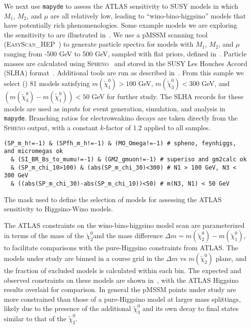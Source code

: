 \documentclass{article}
\newcommand{\chioz}{\ensuremath{\widetilde{\chi}_{1}^{0}}}
\newcommand{\chitz}{\ensuremath{\widetilde{\chi}_{2}^{0}}}
\newcommand{\chithz}{\ensuremath{\widetilde{\chi}_{3}^{0}}}
\newcommand{\mapyde}{\texttt{mapyde}}
\newcommand{\easyscanhep}{\textsc{EasyScan\_HEP}}
\newcommand{\spheno}{\textsc{Spheno}}
\begin{document}
We next use \mapyde{} to assess the ATLAS sensitivity to SUSY models in which $M_1$, $M_2$, and $\mu$ are all relatively low, leading to \enquote{wino-bino-higgsino} models that have potentially rich phenomenologies. Some example models we are exploring the sensitivity to are illustrated in~. We use a pMSSM scanning tool (\easyscanhep~\cite{easyscanhep,Han:2016gvr}) to generate particle spectra for models with $M_1$, $M_2$, and $\mu$ ranging from -500 GeV to 500 GeV, sampled with flat priors, defined in~.  Particle masses are calculated using \spheno~\cite{Porod:2003um,Porod:2011nf} and stored in the SUSY Les Houches Accord (SLHA) format~\cite{Allanach:2008qq}.  Additional tools are run as described in~.  From this sample we select () 81 models satisfying $m(\chioz) > 100$ GeV, $m(\chithz)<300$ GeV, and $(m(\chithz)-m(\chioz))<50$ GeV for further study.  The SLHA records for these models are used as inputs for event generation, simulation, and analysis in \mapyde.  Branching ratios for electroweakino decays are taken directly from the \spheno{} output, with a constant $k$-factor of 1.2 applied to all samples.

\begin{listing}[H]
	\begin{verbatim}
(SP_m_h!=-1) & (SPfh_m_h!=-1) & (MO_Omega!=-1) # spheno, feynhiggs, and micromegas ok
  & (SI_BR_Bs_to_mumu!=-1) & (GM2_gmuon!=-1) # superiso and gm2calc ok
  & (SP_m_chi_10>100) & (abs(SP_m_chi_30)<300) # N1 > 100 GeV, N3 < 300 GeV
  & ((abs(SP_m_chi_30)-abs(SP_m_chi_10))<50) # m(N3, N1) < 50 GeV
  \end{verbatim}
	\caption{The mask used to define the selection of models for assessing the ATLAS sensitivity to Higgsino-Wino models.}
	\label{lst:mask}
\end{listing}


The ATLAS constraints on the wino-bino-higgsino model scan are parameterized in terms of the mass of the \chitz and the mass difference $\Delta m=m(\chitz)-m(\chioz)$, to facilitate comparisons with the pure-Higgsino constraints from ATLAS.  The models under study are binned in a course grid in the $\Delta m$ vs $m(\chitz)$ plane, and the fraction of excluded models is calculated within each bin.  The expected and observed constraints on these models are shown in~, with the ATLAS Higgsino results overlaid for comparison.  In general the pMSSM points under study are more constrained than those of a pure-Higgsino model at larger mass splittings, likely due to the presence of the additional \chithz{} and its own decay to final states similar to that of the \chitz.
\end{document}
